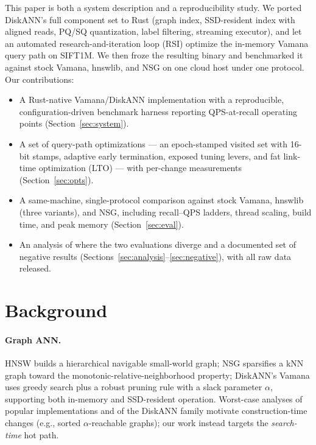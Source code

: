 \documentclass[11pt]{article}
\begin{document}
This paper is both a system description and a reproducibility study.
We ported DiskANN's full component set to Rust (graph index, SSD-resident
index with aligned reads, PQ/SQ quantization, label filtering, streaming
executor), and let an automated research-and-iteration loop (RSI) optimize
the in-memory Vamana query path on SIFT1M. We then froze the resulting binary
and benchmarked it against stock Vamana, hnswlib, and NSG on one cloud host
under one protocol. Our contributions:

\begin{itemize}
  \item A Rust-native Vamana/DiskANN implementation with a reproducible,
  configuration-driven benchmark harness reporting QPS-at-recall operating
  points (Section~\ref{sec:system}).
  \item A set of query-path optimizations --- an epoch-stamped visited set
  with 16-bit stamps, adaptive early termination, exposed tuning levers, and
  fat link-time optimization (LTO) --- with per-change measurements
  (Section~\ref{sec:opts}).
  \item A same-machine, single-protocol comparison against stock Vamana,
  hnswlib (three variants), and NSG, including recall--QPS ladders, thread
  scaling, build time, and peak memory (Section~\ref{sec:eval}).
  \item An analysis of where the two evaluations diverge and a documented set
  of negative results (Sections~\ref{sec:analysis}--\ref{sec:negative}),
  with all raw data released.
\end{itemize}

\section{Background}
\label{sec:background}
\paragraph{Graph ANN.} HNSW \cite{malkov2020hnsw} builds a hierarchical
navigable small-world graph; NSG \cite{fu2019nsg} sparsifies a kNN graph
toward the monotonic-relative-neighborhood property; DiskANN's Vamana
\cite{subramanya2019diskann} uses greedy search plus a robust pruning rule
with a slack parameter $\alpha$, supporting both in-memory and SSD-resident
operation. Worst-case analyses of popular implementations
\cite{indyk2023worstcase} and of the DiskANN family
\cite{gollapudi2025sort} motivate construction-time changes
(e.g., sorted $\alpha$-reachable graphs); our work instead targets the
\emph{search-time} hot path.
\end{document}
